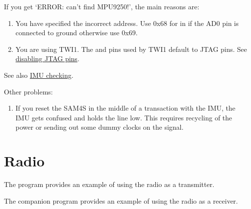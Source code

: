 If you get `ERROR: can't find MPU9250!', the main reasons are:

\begin{enumerate}
\item
  You have specified the incorrect address.  Use 0x68 for
   in  if the AD0 pin is connected to
  ground otherwise use 0x69.
\item
  You are using TWI1. The  and  pins used by TWI1
  default to JTAG pins. See
  \protect\hyperref[disabling-jtag-pins]{disabling JTAG pins}.
\end{enumerate}
%
See also \protect\hyperref[checking-IMU]{IMU checking}.

Other problems:
%
\begin{enumerate}
\item If you reset the SAM4S in the middle of a transaction with the
IMU, the IMU gets confused and holds the  line low. This
requires recycling of the power or sending out some dummy clocks on
the  signal.
\end{enumerate}


\section{Radio}
\label{radio-test}

The program  provides
an example of using the radio as a transmitter.

The companion program
 provides an example
of using the radio as a receiver.

\inputminted{C}{../../src/test-apps/radio_rx_test1/radio_rx_test1.c}


